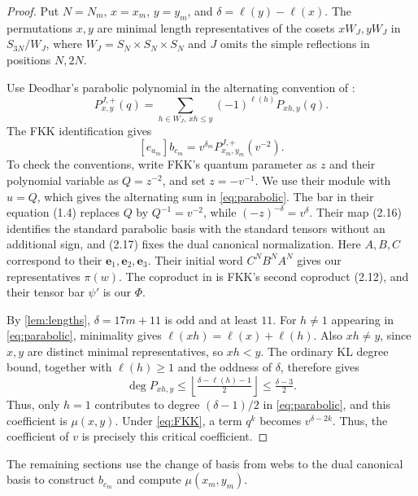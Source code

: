 \documentclass[a4paper,11pt]{amsart}
\newcommand{\qpar}{q}
\newcommand{\tpar}{v}
\numberwithin{equation}{subsection}
\theoremstyle{plain}
\theoremstyle{definition}
\theoremstyle{remark}
\begin{document}
\begin{proof}
Put $N=N_m$, $x=x_m$, $y=y_m$, and
$\delta=\ell(y)-\ell(x)$.
The permutations $x,y$ are minimal length representatives of
the cosets $xW_J,yW_J$ in $S_{3N}/W_J$, where
$W_J=S_N\times S_N\times S_N$ and $J$ omits the simple
reflections in positions $N,2N$.

Use Deodhar's parabolic polynomial \cite{Deodhar} in the
alternating convention of \cite[(1.6)]{FKK}:
\begin{equation}\label{eq:parabolic}
P^{J,+}_{x,y}(\qpar)
=\sum_{h\in W_J,\,xh\le y}(-1)^{\ell(h)}P_{xh,y}(\qpar).
\end{equation}
The FKK identification \cite[Theorem $2.5'$]{FKK} gives
\begin{equation}\label{eq:FKK}
[e_{a_m}]b_{c_m}
=\tpar^{\delta_m}P^{J,+}_{x_m,y_m}(\tpar^{-2}).
\end{equation}
To check the conventions, write FKK's quantum parameter as $z$
and their polynomial variable as $Q=z^{-2}$, and set $z=-\tpar^{-1}$.
We use their module with $u=Q$, which gives the alternating
sum in \autoref{eq:parabolic}.
The bar in their equation (1.4) replaces $Q$ by
$Q^{-1}=\tpar^{-2}$, while $(-z)^{-\delta}=\tpar^{\delta}$.
Their map (2.16) identifies the standard parabolic basis with
the standard tensors without an additional sign, and (2.17)
fixes the dual canonical normalization.
Here $A,B,C$ correspond to their
$\mathbf e_1,\mathbf e_2,\mathbf e_3$.
Their initial word $C^NB^NA^N$ gives our representatives
$\pi(w)$. The coproduct in \cite[Section 2]{KK} is FKK's
second coproduct (2.12), and their tensor bar $\psi'$ is our $\Phi$.

By \autoref{lem:lengths}, $\delta=17m+11$ is odd and at least $11$.
For $h\ne1$ appearing in \autoref{eq:parabolic}, minimality
gives $\ell(xh)=\ell(x)+\ell(h)$. Also $xh\ne y$, since $x,y$ are
distinct minimal representatives, so $xh<y$.
The ordinary KL degree bound, together with $\ell(h)\ge1$
and the oddness of $\delta$, therefore gives
\[
\deg P_{xh,y}\le
\left\lfloor\tfrac{\delta-\ell(h)-1}{2}\right\rfloor
\le\tfrac{\delta-3}{2}.
\]
Thus, only $h=1$ contributes to degree $(\delta-1)/2$ in
\autoref{eq:parabolic}, and this coefficient is $\mu(x,y)$.
Under \autoref{eq:FKK}, a term $\qpar^k$ becomes $\tpar^{\delta-2k}$.
Thus, the coefficient of $\tpar$ is precisely this critical coefficient.
\end{proof}

The remaining sections use the change of basis from webs to the
dual canonical basis to construct $b_{c_m}$ and compute $\mu(x_m,y_m)$.
\end{document}

